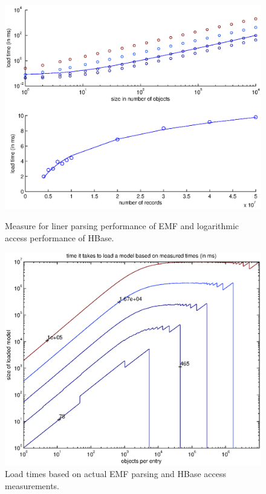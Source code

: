 \begin{figure}[ht]
\begin{minipage}[b]{0.5\linewidth}
\centering
\includegraphics[width=\linewidth]{figures/emf_hbase_performance_measured}
\caption{Measure for liner parsing performance of EMF and logarithmic access performance of HBase.}
\label{fig:figures/emf_hbase_performance_measured}
\end{minipage}
\hspace{0.5cm}
\begin{minipage}[b]{0.5\linewidth}
\centering
\includegraphics[width=\linewidth]{figures/optimal_load_times_measured}
\caption{Load times based on actual EMF parsing and HBase access measurements.}
\label{fig:optimal_load_times_measured}
\end{minipage}
\end{figure}

